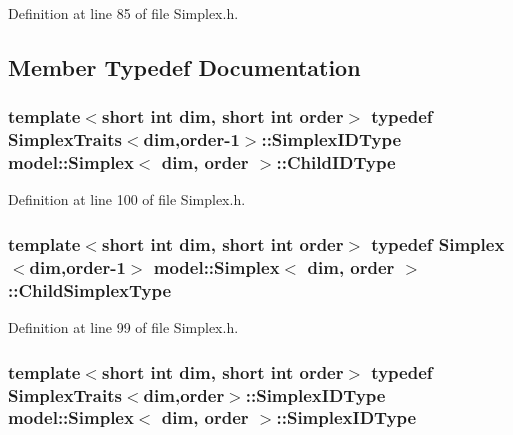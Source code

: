 Definition at line 85 of file Simplex.\+h.



\subsection{Member Typedef Documentation}
\hypertarget{classmodel_1_1_simplex_a7b81b988588a5b1aa9d568d0ce2b1702}{}
\subsubsection[{Child\+I\+D\+Type}]{\setlength{\rightskip}{0pt plus 5cm}template$<$short int dim, short int order$>$ typedef {\bf Simplex\+Traits}$<${\bf dim},order-\/1$>$\+::{\bf Simplex\+I\+D\+Type} {\bf model\+::\+Simplex}$<$ {\bf dim}, order $>$\+::{\bf Child\+I\+D\+Type}}\label{classmodel_1_1_simplex_a7b81b988588a5b1aa9d568d0ce2b1702}


Definition at line 100 of file Simplex.\+h.

\hypertarget{classmodel_1_1_simplex_a46dfe21eca46643d60dca2f44f1a80fa}{}
\subsubsection[{Child\+Simplex\+Type}]{\setlength{\rightskip}{0pt plus 5cm}template$<$short int dim, short int order$>$ typedef {\bf Simplex}$<${\bf dim},order-\/1$>$ {\bf model\+::\+Simplex}$<$ {\bf dim}, order $>$\+::{\bf Child\+Simplex\+Type}}\label{classmodel_1_1_simplex_a46dfe21eca46643d60dca2f44f1a80fa}


Definition at line 99 of file Simplex.\+h.

\hypertarget{classmodel_1_1_simplex_a77f355697a218f3f31a38676ad6ff31d}{}
\subsubsection[{Simplex\+I\+D\+Type}]{\setlength{\rightskip}{0pt plus 5cm}template$<$short int dim, short int order$>$ typedef {\bf Simplex\+Traits}$<${\bf dim},order$>$\+::{\bf Simplex\+I\+D\+Type} {\bf model\+::\+Simplex}$<$ {\bf dim}, order $>$\+::{\bf Simplex\+I\+D\+Type}}\label{classmodel_1_1_simplex_a77f355697a218f3f31a38676ad6ff31d}


